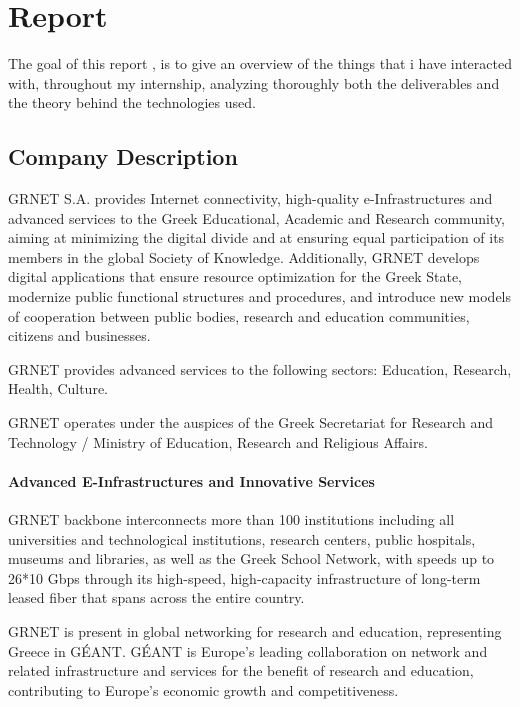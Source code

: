 
\chapter{Report}

The goal of this report , is to give an overview of the things that i have interacted with, throughout my internship, analyzing thoroughly both the deliverables and the theory behind the technologies used.

\section{Company Description}
GRNET S.A. provides Internet connectivity,
high-quality e-Infrastructures and advanced services to the Greek Educational,
Academic and Research community,
aiming at minimizing the digital divide and
at ensuring equal participation of its members
in the global Society of Knowledge.
Additionally, GRNET develops digital applications that
ensure resource optimization for the Greek State,
modernize public functional structures and procedures,
and introduce new models of cooperation between public bodies,
research and education communities, citizens and businesses.

GRNET provides advanced services to the following sectors:
Education, Research, Health, Culture.

GRNET operates under the auspices of
the Greek Secretariat for Research and Technology /
Ministry of Education, Research and Religious Affairs.

\subsubsection{Advanced E-Infrastructures and Innovative Services}
GRNET backbone interconnects more than 100 institutions including
all universities and technological institutions,
research centers, public hospitals, museums and libraries,
as well as the Greek School Network,
with speeds up to 26*10 Gbps through its high-speed,
high-capacity infrastructure of long-term leased fiber
that spans across the entire country.\par

GRNET is present in global networking for research and education,
representing Greece in GÉANT.
GÉANT is Europe’s leading collaboration on network
and related infrastructure and services
for the benefit of research and education,
contributing to Europe’s economic growth and competitiveness.

